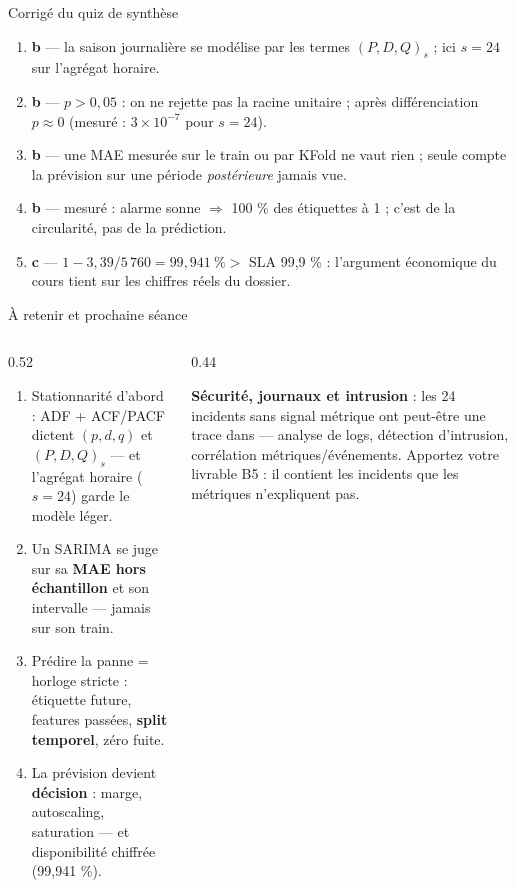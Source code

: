 \begin{frame}{Corrigé du quiz de synthèse}
\begin{solbox}
\begin{enumerate}
\item \textbf{b} --- la saison journalière se modélise par les termes
$(P,D,Q)_{s}$ ; ici $s = 24$ sur l'agrégat horaire.
\item \textbf{b} --- $p > 0{,}05$ : on ne rejette pas la racine
unitaire ; après différenciation $p \approx 0$ (mesuré :
$3\times10^{-7}$ pour $s = 24$).
\item \textbf{b} --- une MAE mesurée sur le train ou par KFold ne vaut
rien ; seule compte la prévision sur une période \emph{postérieure}
jamais vue.
\item \textbf{b} --- mesuré : alarme sonne $\Rightarrow$ 100 \% des
étiquettes à 1 ; c'est de la circularité, pas de la prédiction.
\item \textbf{c} --- $1 - 3{,}39/5\,760 = 99{,}941\ \% >$ SLA 99,9 \% :
l'argument économique du cours tient sur les chiffres réels du dossier.
\end{enumerate}
\end{solbox}
\end{frame}

\begin{frame}{À retenir et prochaine séance}
\begin{columns}[t]
\begin{column}{0.52\textwidth}
\begin{kbox}
\begin{enumerate}
\item Stationnarité d'abord : ADF + ACF/PACF dictent $(p,d,q)$ et
$(P,D,Q)_s$ --- et l'agrégat horaire ($s=24$) garde le modèle léger.
\item Un SARIMA se juge sur sa \textbf{MAE hors échantillon} et son
intervalle --- jamais sur son train.
\item Prédire la panne = horloge stricte : étiquette future, features
passées, \textbf{split temporel}, zéro fuite.
\item La prévision devient \textbf{décision} : marge, autoscaling,
saturation --- et disponibilité chiffrée (99,941 \%).
\end{enumerate}
\end{kbox}
\end{column}
\begin{column}{0.44\textwidth}
\begin{ebox}
\textbf{Sécurité, journaux et intrusion} : les 24 incidents sans
signal métrique ont peut-être une trace dans  ---
analyse de logs, détection d'intrusion, corrélation métriques/événements.
Apportez votre livrable B5 : il contient les incidents que les
métriques n'expliquent pas.
\end{ebox}
\end{column}
\end{columns}
\end{frame}
